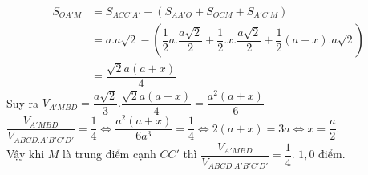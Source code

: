 \begin{bt}
{\begin{enumerate}
\begin{itemize}
	\begin{align*}
	S_{OA'M}&=S_{ACC'A'}-\left(S_{AA'O}+S_{OCM}+S_{A'C'M}\right)\\ &=a.a\sqrt{2}-\left(\dfrac{1}{2}a.\dfrac{a\sqrt{2}}{2}+\dfrac{1}{2}.x.\dfrac{a\sqrt{2}}{2}+\dfrac{1}{2}(a-x).a\sqrt{2}\right)\\&=\dfrac{\sqrt{2}a(a+x)}{4}
	\end{align*}
	Suy ra $V_{A'MBD}=\dfrac{a\sqrt{2}}{3}.\dfrac{\sqrt{2}a(a+x)}{4}=\dfrac{a^2(a+x)}{6}$\\
	$\dfrac{V_{A'MBD}}{V_{ABCD.A'B'C'D'}}=\dfrac{1}{4}\Leftrightarrow \dfrac{a^2(a+x)}{6a^3}=\dfrac{1}{4}\Leftrightarrow 2(a+x)=3a\Leftrightarrow x=\dfrac{a}{2}$.\\
Vậy khi $M$ là trung điểm cạnh $CC'$ thì  $\dfrac{V_{A'MBD}}{V_{ABCD.A'B'C'D'}}=\dfrac{1}{4}$. \dotfill $1{,}0$ điểm.
	\end{itemize}
\end{enumerate}
	}
\end{bt}
